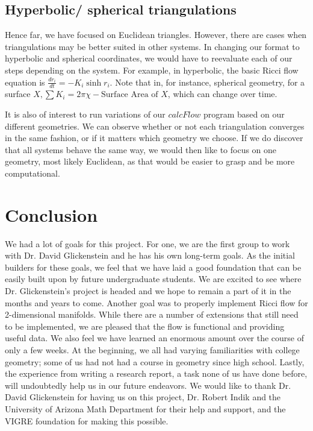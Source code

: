 \documentclass[12pt]{article}
\begin{document}
\subsection{Hyperbolic/ spherical triangulations}
\label{HypSphere}
Hence far, we have focused on Euclidean triangles. However, there are cases when triangulations may be better suited in other systems. In changing our format to hyperbolic and spherical coordinates, we would have to reevaluate each of our steps depending on the system. For example, in hyperbolic, the basic Ricci flow equation is $\displaystyle \frac{dr_i}{dt} = -K_i\sinh r_i$. Note that in, for instance, spherical geometry, for a surface $X, \displaystyle \sum{K_i} = 2\pi\chi - \mbox{Surface Area of } X$, which can change over time. \newline

\noindent It is also of interest to run variations of our $calcFlow$ program based on our different geometries. We can observe whether or not each triangulation converges in the same fashion, or if it matters which geometry we choose. If we do discover that all systems behave the same way, we would then like to focus on one geometry, most likely Euclidean, as that would be easier to grasp and be more computational. 

\section{Conclusion}

We had a lot of goals for this project. For one, we are the first group to work with Dr. David Glickenstein and he has his own long-term goals. As the initial builders for these goals, we feel that we have laid a good foundation that can be easily built upon by future undergraduate students. We are excited to see where Dr. Glickenstein's project is headed and we hope to remain a part of it in the months and years to come. Another goal was to properly implement Ricci flow for 2-dimensional manifolds. While there are a number of extensions that still need to be implemented, we are pleased that the flow is functional and providing useful data. We also feel we have learned an enormous amount over the course of only a few weeks. At the beginning, we all had varying familiarities with college geometry; some of us had not had a course in geometry since high school. Lastly, the experience from writing a research report, a task none of us have done before, will undoubtedly help us in our future endeavors. We would like to thank Dr. David Glickenstein for having us on this project, Dr. Robert Indik and the University of Arizona Math Department for their help and support, and the VIGRE foundation for making this possible.
  
\end{document}

